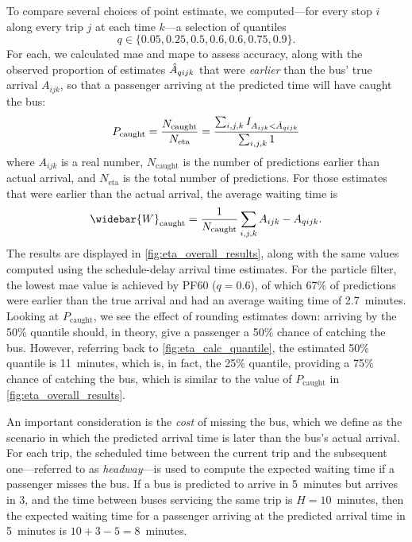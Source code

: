 To compare several choices of point estimate, we computed---for every stop $i$ along every trip $j$ at each time $k$---a selection of quantiles
\[
  q \in \{0.05, 0.25, 0.5, 0.6, 0.6, 0.75, 0.9\}.
\]
For each, we calculated \gls{mae} and \gls{mape} to assess accuracy, along with the observed proportion of estimates $\hat{A}_{qijk}$ that were \emph{earlier} than the bus' true arrival $A_{ijk}$, so that a passenger arriving at the predicted time will have caught the bus:
\begin{equation}
\label{eq:pr_bus_caught}
P_\text{caught} = \frac{N_\text{caught}}{N_\text{eta}}
= \frac{\sum_{i,j,k} I_{A_{ijk} < \hat{A}_{qijk}}}{\sum_{i,j,k} 1}
\end{equation}
where $A_{ijk}$ is a real number, $N_\text{caught}$ is the number of predictions earlier than actual arrival, and $N_\text{eta}$ is the total number of predictions. For those estimates that were earlier than the actual arrival, the average waiting time is
\begin{equation}
\label{eq:avg_wait_time}
\widebar{W}_\text{caught} =
\frac{1}{N_\text{caught}} \sum_{i,j,k} A_{ijk} - \Teta_{qijk}.
\end{equation}
The results are displayed in \cref{fig:eta_overall_results}, along with the same values computed using the schedule-delay arrival time estimates. For the particle filter, the lowest \gls{mae} value is achieved by PF60 ($q = 0.6$), of which 67\% of predictions were earlier than the true arrival and had an average waiting time of 2.7~minutes. Looking at $P_\text{caught}$, we see the effect of rounding estimates down: arriving by the 50\% quantile should, in theory, give a passenger a 50\% chance of catching the bus. However, referring back to \cref{fig:eta_calc_quantile}, the estimated 50\% quantile is 11~minutes, which is, in fact, the 25\% quantile, providing a 75\% chance of catching the bus, which is similar to the value of $P_\text{caught}$ in \cref{fig:eta_overall_results}.



An important consideration is the \emph{cost} of missing the bus, which we define as the scenario in which the predicted arrival time is later than the bus's actual arrival. For each trip, the scheduled time between the current trip and the subsequent one---referred to as \emph{headway}---is used to compute the expected waiting time if a passenger misses the bus. If a bus is predicted to arrive in 5~minutes but arrives in 3, and the time between buses servicing the same trip is $H = 10$~minutes, then the expected waiting time for a passenger arriving at the predicted arrival time in 5~minutes is $10+3-5=8$~minutes.


